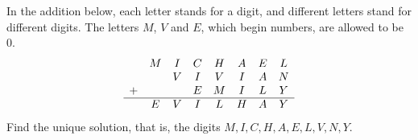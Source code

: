 In the addition below, each letter stands for a digit, and different letters stand for different digits. The letters $M$, $V$ and $E$, which begin numbers, are allowed to be $0$.
\[\begin{array}{cccccccc}
 & M & I & C & H & A & E & L\\
 &   & V & I & V & I & A & N\\
+&   &   & E & M & I & L & Y\\ \hline
 & E & V & I & L & H & A & Y
\end{array}\]
Find the unique solution, that is, the digits $M,I,C,H,A,E,L,V,N,Y$.
